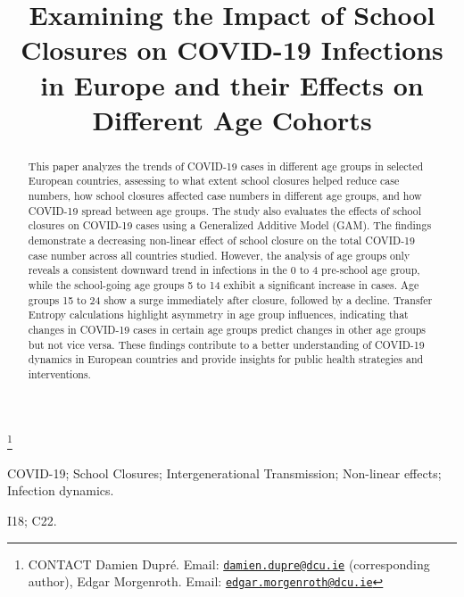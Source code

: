 \documentclass[]{interact}
\theoremstyle{plain}%
\theoremstyle{definition}
\theoremstyle{remark}
\begin{document}
\articletype{}

\title{Examining the Impact of School Closures on COVID-19 Infections in Europe and their Effects on Different Age Cohorts}


\author{
}

\thanks{CONTACT Damien Dupré. Email: \href{mailto:damien.dupre@dcu.ie}{\nolinkurl{damien.dupre@dcu.ie}} (corresponding author), Edgar Morgenroth. Email: \href{mailto:edgar.morgenroth@dcu.ie}{\nolinkurl{edgar.morgenroth@dcu.ie}}}

\maketitle

\begin{abstract}
This paper analyzes the trends of COVID-19 cases in different age groups in selected European countries, assessing to what extent school closures helped reduce case numbers, how school closures affected case numbers in different age groups, and how COVID-19 spread between age groups. The study also evaluates the effects of school closures on COVID-19 cases using a Generalized Additive Model (GAM). The findings demonstrate a decreasing non-linear effect of school closure on the total COVID-19 case number across all countries studied. However, the analysis of age groups only reveals a consistent downward trend in infections in the 0 to 4 pre-school age group, while the school-going age groups 5 to 14 exhibit a significant increase in cases. Age groups 15 to 24 show a surge immediately after closure, followed by a decline. Transfer Entropy calculations highlight asymmetry in age group influences, indicating that changes in COVID-19 cases in certain age groups predict changes in other age groups but not vice versa. These findings contribute to a better understanding of COVID-19 dynamics in European countries and provide insights for public health strategies and interventions.
\end{abstract}

\begin{keywords}
COVID-19; School Closures; Intergenerational Transmission; Non-linear effects; Infection dynamics.
\end{keywords}

\begin{jelcode}
I18; C22.
\end{jelcode}
\end{document}
